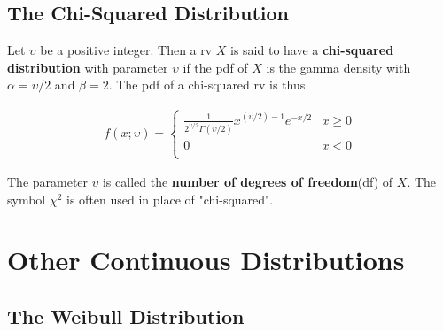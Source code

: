 \subsection{The Chi-Squared Distribution}

\begin{definition}
    Let $\upsilon$ be a positive integer. Then a rv $X$ is said to have a \textbf{chi-squared distribution} with parameter $\upsilon$ if the pdf of $X$ is the gamma density with $\alpha = \upsilon / 2$ and $\beta = 2$. The pdf of a chi-squared rv is thus

    \begin{align*}
        f(x;\upsilon) = \left\{\begin{array}{cl}
            \frac{1}{2^{\upsilon/2}\Gamma(\upsilon/2)}x^{(\upsilon / 2)-1} e^{-x/2} & x\geq 0 \\
            0 & x < 0 \\
        \end{array}\right.
    \end{align*}

    The parameter $\upsilon$ is called the \textbf{number of degrees of freedom}(df) of $X$. The symbol $\chi^2$ is often used in place of "chi-squared".
\end{definition}

\section{Other Continuous Distributions}

\subsection{The Weibull Distribution}

